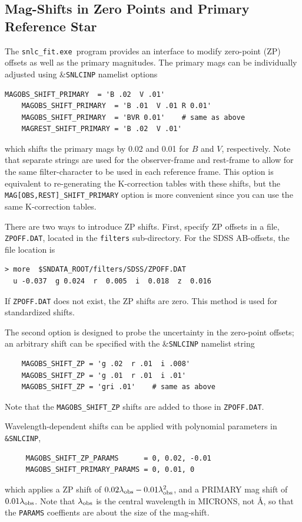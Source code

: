 \documentclass[12pt]{article}
\newcommand{\snfitter}{{\tt snlc\_fit.exe}}
\newcommand{\lamobs}{\lambda_{\rm obs}}
\begin{document}
   \subsection{Mag-Shifts in Zero Points and Primary Reference Star }
   \label{subsec:zpshifts}

The \snfitter\ program provides an interface to modify 
zero-point (ZP) offsets as well as the primary magnitudes.
The primary mags can be individually adjusted using 
\&{\tt SNLCINP} namelist options
%
\begin{Verbatim}[frame=single]
    MAGOBS_SHIFT_PRIMARY  = 'B .02  V .01'
    MAGOBS_SHIFT_PRIMARY  = 'B .01  V .01 R 0.01'
    MAGOBS_SHIFT_PRIMARY  = 'BVR 0.01'    # same as above
    MAGREST_SHIFT_PRIMARY = 'B .02  V .01'
\end{Verbatim}
%
which shifts the primary mags by 0.02 and 0.01 for $B$ and $V$,
respectively.
Note that separate strings are used for the
observer-frame and rest-frame to allow for the same 
filter-character to be used in each reference frame.
This option is equivalent to re-generating the
K-correction tables with these shifts, 
but the {\tt MAG[OBS,REST]\_SHIFT\_PRIMARY}
option is more convenient since you can use the same K-correction tables.


There are two ways to introduce ZP shifts.
First, specify ZP offsets in a file, {\tt ZPOFF.DAT},
located in the {\tt filters} sub-directory. For the SDSS AB-offsets,
the file location is
%
\begin{Verbatim}[frame=single]
  > more  $SNDATA_ROOT/filters/SDSS/ZPOFF.DAT
  u -0.037  g 0.024  r  0.005  i  0.018  z  0.016 
\end{Verbatim}
If {\tt ZPOFF.DAT} does not exist, the ZP shifts are zero.
This method is used for standardized shifts.

The second option is designed to probe the uncertainty
in the zero-point offsets; an arbitrary shift can be
specified with the \&{\tt SNLCINP} namelist string
%
\begin{verbatim}
    MAGOBS_SHIFT_ZP = 'g .02  r .01  i .008' 
    MAGOBS_SHIFT_ZP = 'g .01  r .01  i .01' 
    MAGOBS_SHIFT_ZP = 'gri .01'    # same as above
\end{verbatim}
%
Note that the {\tt MAGOBS\_SHIFT\_ZP} shifts are
added to those in {\tt ZPOFF.DAT}.

\medskip
Wavelength-dependent shifts can be applied with polynomial
parameters in {\tt \&SNLCINP},
%
\begin{verbatim}  
     MAGOBS_SHIFT_ZP_PARAMS      = 0, 0.02, -0.01 
     MAGOBS_SHIFT_PRIMARY_PARAMS = 0, 0.01, 0
\end{verbatim}
%
which applies a ZP shift of $0.02\lamobs -0.01\lamobs^2$,
and a PRIMARY mag shift of $0.01\lamobs$.
Note that $\lamobs$ is the central wavelength in MICRONS, not \AA,
so that the {\tt PARAMS} coeffients are about the
size of the mag-shift.
\end{document}

